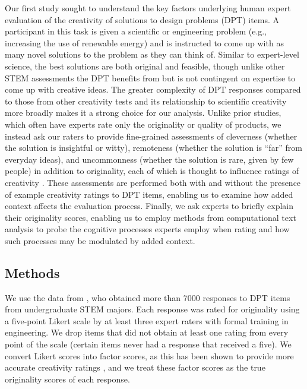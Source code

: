 Our first study sought to understand the key factors underlying human expert evaluation of the creativity of solutions to design problems (DPT) items. A participant in this task is given a scientific or engineering problem (e.g., increasing the use of renewable energy) and is instructed to come up with as many novel solutions to the problem as they can think of. Similar to expert-level science, the best solutions are both original and feasible, though unlike other STEM assessments the DPT benefits from but is not contingent on expertise to come up with creative ideas. The greater complexity of DPT responses compared to those from other creativity tests and its relationship to scientific creativity more broadly makes it a strong choice for our analysis. Unlike prior studies, which often have experts rate only the originality or quality of products, we instead ask our raters to provide fine-grained assessments of cleverness (whether the solution is insightful or witty), remoteness (whether the solution is ``far'' from everyday ideas), and uncommonness (whether the solution is rare, given by few people) in addition to originality, each of which is thought to influence ratings of creativity \citep{silvia2008assessing}. These assessments are performed both with and without the presence of example creativity ratings to DPT items, enabling us to examine how added context affects the evaluation process. Finally, we ask experts to briefly explain their originality scores, enabling us to employ methods from computational text analysis to probe the cognitive processes experts employ when rating and how such processes may be modulated by added context.

\subsection{Methods}
We use the data from \citet{Patterson2025}, who obtained more than 7000 responses to DPT items from undergraduate STEM majors. Each response was rated for originality using a five-point Likert scale by at least three expert raters with formal training in engineering. We drop items that did not obtain at least one rating from every point of the scale (certain items never had a response that received a five). We convert Likert scores into factor scores, as this has been shown to provide more accurate creativity ratings \citep{silvia2008another}, and we treat these factor scores as the true originality scores of each response.

